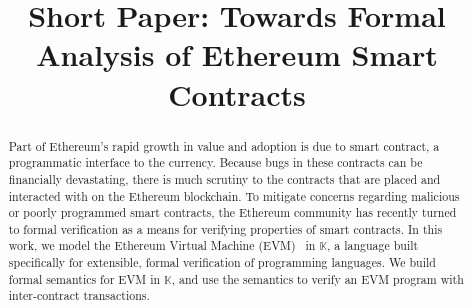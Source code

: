 \documentclass{llncs}
\begin{document}
\thispagestyle{empty}

\title{Short Paper: Towards Formal Analysis of Ethereum  Smart Contracts}

\newif\ifblind\blindfalse %

\ifblind
\author{Everett Hildenbrandt\inst{1} \and Manasvi Saxena\inst{1} \and Deepak
Kumar\inst{1} \and Zane Ma\inst{1}}

\institute{University of Illinois, Urbana-Champaign}
\else
\author{}
\institute{}
\fi

\newcommand{\K}{$\mathbb{K}$}

\maketitle
\begin{abstract}
Part of Ethereum's rapid growth in value and adoption is due to
smart contract, a  programmatic interface to the currency. Because bugs in
these contracts can be financially devastating, there is much scrutiny to the contracts that are
placed and interacted with on the Ethereum blockchain. To mitigate concerns
regarding malicious or poorly programmed smart contracts, the Ethereum community
has recently turned to formal verification as a means for verifying properties
of smart contracts. In this work, we model the Ethereum Virtual Machine
(EVM)~\cite{wood2014ethereum} in \K{}, a language built
specifically for extensible, formal verification of programming languages. We
build formal semantics for EVM in \K{}, and use the semantics to verify an EVM
program with inter-contract transactions.
\end{abstract}
% 










\small

\nocite{*}
\end{document}
